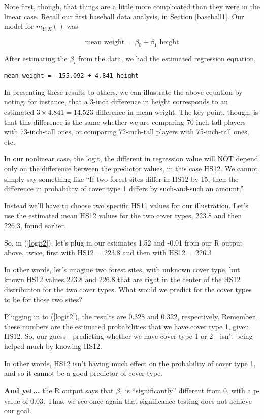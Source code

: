 Note first, though, that things are a little more complicated than they
were in the linear case.  Recall our first baseball data analysis, in
Section \ref{baseball1}.  Our model for $m_{Y;X}()$ was

\begin{equation}
\textrm{mean weight = } 
\beta_0 + \beta_1 \textrm{ height}
\end{equation}

After estimating the $\beta_i$ from the data, we had the estimated
regression equation,

\begin{lstlisting}
mean weight = -155.092 + 4.841 height
\end{lstlisting}

In presenting these results to others, we can illustrate the above
equation by noting, for instance, that a 3-inch difference in height
corresponds to an estimated $3 \times 4.841 = 14.523$ difference in mean
weight.  The key point, though, is that this difference is the same
whether we are comparing 70-inch-tall players with 73-inch-tall ones, or
comparing 72-inch-tall players with 75-inch-tall ones, etc.  

In our nonlinear case, the logit, the different in regression value will
NOT depend only on the difference between the predictor values, in this
case HS12.  We cannot simply say something like ``If two forest sites
differ in HS12 by 15, then the difference in probability of cover type 1
differs by such-and-such an amount.''  

Instead we'll have to choose two specific HS11 values for our
illustration.  Let's use the estimated mean HS12 values for the two
cover types, 223.8 and then 226.3, found earlier.  

So, in (\ref{logit2}), let's plug in our estimates 1.52 and -0.01 from
our R output above, twice, first with HS12 = 223.8 and then with HS12 =
226.3   

In other words, let's imagine two forest sites, with unknown cover type,
but known HS12 values 223.8 and 226.8 that are right in the center of
the HS12 distribution for the two cover types.  What would we predict
for the cover types to be for those two sites?

Plugging in to (\ref{logit2}), the results are 0.328 and 0.322,
respectively.  Remember, these numbers are the estimated probabilities
that we have cover type 1, given HS12.  So, our guess---predicting
whether we have cover type 1 or 2---isn't being helped much by knowing
HS12.

In other words, HS12 isn't having much effect on the probability of
cover type 1, and so it cannot be a good predictor of cover type.  

{\bf And yet...} the R output says that $\beta_1$ is ``significantly''
different from 0, with a p-value of 0.03.  Thus, we see once again that
significance testing does not achieve our goal.  

